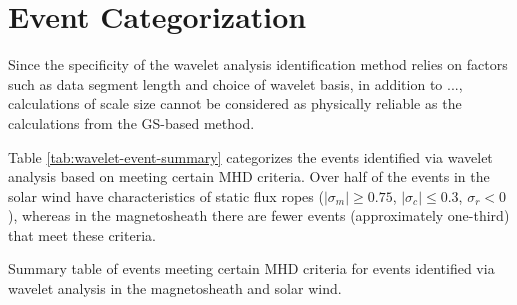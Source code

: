 \section{Event Categorization}
Since the specificity of the wavelet analysis identification method relies on factors such as data segment length and choice of wavelet basis, in addition to ..., calculations of scale size cannot be considered as physically reliable as the calculations from the GS-based method.

Table \ref{tab:wavelet-event-summary} categorizes the events identified via wavelet analysis based on meeting certain MHD criteria. Over half of the events in the solar wind have characteristics of static flux ropes ($|\sigma_m|\geq 0.75$, $|\sigma_c|\leq 0.3$, $\sigma_r<0$), whereas in the magnetosheath there are fewer events (approximately one-third) that meet these criteria.

\begin{table}
    \centering
    
    \caption{Summary table of events meeting certain MHD criteria for events identified via wavelet analysis in the magnetosheath and solar wind.}
    \label{tab:wavelet-event-summary}
\end{table}